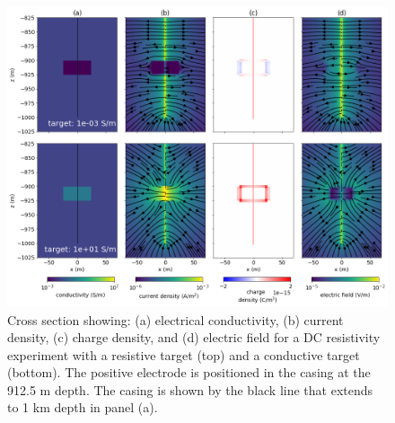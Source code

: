 \begin{figure}
    \begin{center}
    \includegraphics[width=\textwidth]{figures/dc_casing/target_physics.png}
    \end{center}
\caption{
    Cross section showing: (a) electrical conductivity, (b) current density, (c) charge density, and
    (d) electric field for a DC resistivity experiment with a resistive target (top) and a conductive target
    (bottom). The positive electrode is positioned in the casing at the 912.5 m depth.
    The casing is shown by the black line that extends to 1 km
    depth in panel (a).
}
\label{fig:target_physics}
\end{figure}
